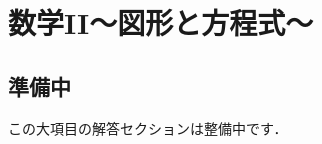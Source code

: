 \documentclass[../../ms_a.tex]{subfiles}
\begin{document}
\section{数学II～図形と方程式～}

\subsection*{準備中}
この大項目の解答セクションは整備中です．
\end{document}
